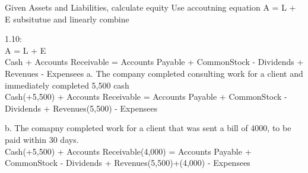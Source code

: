 \documentclass[12pt]{article}
\newenvironment{statement}[2][Section:]{\begin{trivlist}
\item[\hskip \labelsep {\bfseries #1}\hskip \labelsep {\bfseries #2.}]}{\end{trivlist}}
\begin{document}
\begin{statement}{Practice Excercises}


  Given Assets and Liabilities, calculate equity
 Use accoutning equation A = L + E
 subsitutue and linearly combine

 1.10:\\
 A = L + E\\
 Cash + Accounts Receivable = Accounts Payable + CommonStock - Dividends + Revenues - Expensees
 a. The company completed consulting work for a client and immediately completed 5,500 cash\\

 Cash(+5,500) + Accounts Receivable = Accounts Payable + CommonStock - Dividends + Revenues(5,500) - Expensees

b. The comapny completed work for a client that was sent a bill of 4000, to be paid within 30 days.\\
 Cash(+5,500) + Accounts Receivable(4,000) = Accounts Payable + CommonStock - Dividends + Revenues(5,500)+(4,000) - Expensees
 

\end{statement}







 
\end{document}
